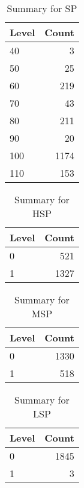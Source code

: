 \begin{table}[ht]
\centering
\begin{tabular}{lr}
  \hline
Level & Count \\ 
  \hline
40 &   3 \\ 
  50 &  25 \\ 
  60 & 219 \\ 
  70 &  43 \\ 
  80 & 211 \\ 
  90 &  20 \\ 
  100 & 1174 \\ 
  110 & 153 \\ 
   \hline
\end{tabular}
\caption{Summary for SP} 
\label{tab: SP}
\end{table}
\begin{table}[ht]
\centering
\begin{tabular}{lr}
  \hline
Level & Count \\ 
  \hline
0 & 521 \\ 
  1 & 1327 \\ 
   \hline
\end{tabular}
\caption{Summary for HSP} 
\label{tab: HSP}
\end{table}
\begin{table}[ht]
\centering
\begin{tabular}{lr}
  \hline
Level & Count \\ 
  \hline
0 & 1330 \\ 
  1 & 518 \\ 
   \hline
\end{tabular}
\caption{Summary for MSP} 
\label{tab: MSP}
\end{table}
\begin{table}[ht]
\centering
\begin{tabular}{lr}
  \hline
Level & Count \\ 
  \hline
0 & 1845 \\ 
  1 &   3 \\ 
   \hline
\end{tabular}
\caption{Summary for LSP} 
\label{tab: LSP}
\end{table}
